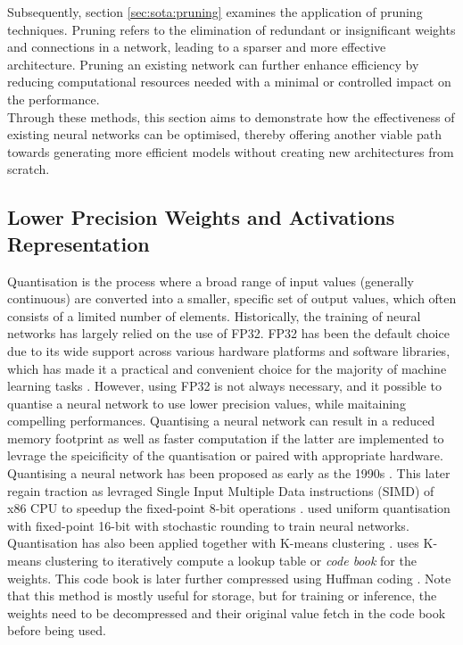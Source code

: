 Subsequently, section \cref{sec:sota:pruning} examines the application of
pruning techniques. Pruning refers to the elimination of redundant or
insignificant weights and connections in a network, leading to a sparser and
more effective architecture. Pruning an existing network can further enhance
efficiency by reducing computational resources needed with a minimal or
controlled impact on the performance.\\

Through these methods, this section aims to demonstrate how the effectiveness of
existing neural networks can be optimised, thereby offering another viable path
towards generating more efficient models without creating new architectures from
scratch.\\

\subsection{Lower Precision Weights and Activations Representation}\label{sec:sota:quantisation}

Quantisation is the process where a broad range of input values (generally
continuous) are converted into a smaller, specific set of output values, which
often consists of a limited number of elements. Historically, the training of
neural networks has largely relied on the use of \ac{FP32}. FP32 has been the
default choice due to its wide support across various hardware platforms and
software libraries, which has made it a practical and convenient choice for the
majority of machine learning tasks \cite{sze2017efficient}. However, using
\acl{FP32} is not always necessary, and it possible to quantise a neural network
to use lower precision values, while maitaining compelling performances.
Quantising a neural network can result in a reduced memory footprint as well as
faster computation if the latter are implemented to levrage the speicificity of
the quantisation or paired with appropriate hardware.\\

Quantising a neural network has been proposed as early as the 1990s
\cite{balzer1991weight,fiesler1990weight}. This later regain traction as
\citeauthor{37631} levraged Single Input Multiple Data instructions (SIMD) of
x86 \ac{CPU} to speedup the fixed-point 8-bit operations \cite{37631}.
\citeauthor{gupta2015deep} used uniform quantisation with fixed-point 16-bit
with stochastic rounding to train neural networks. Quantisation has also been
applied together with K-means clustering \cite{steinhaus1956division}.
\cite{DBLP:journals/corr/HanMD15} uses K-means clustering to iteratively compute
a lookup table or \emph{code book} for the weights. This code book is later
further compressed using Huffman coding \cite{huffman1952method}. Note that this
method is mostly useful for storage, but for training or inference, the weights
need to be decompressed and their original value fetch in the code book before
being used.\\

